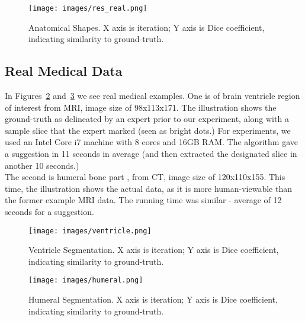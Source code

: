 \begin{figure}[htb]
\centering
  \texttt{[image: images/res\_real.png]}
  \caption[Anatomical Shapes]{
  Anatomical Shapes.
  X axis is iteration; Y axis is Dice coefficient, indicating similarity to ground-truth.}\label{fig:resAnatomical}
\end{figure}

\subsection{Real Medical Data}

In Figures~\ref{fig:ventricle} and~\ref{fig:humeral} we see real medical examples.
One is of brain ventricle region of interest from MRI, image size of 98x113x171.
The illustration shows the ground-truth as delineated by an expert prior to our experiment, along with a sample slice that the expert marked (seen as bright dots.)
For experiments, we used an Intel Core i7 machine with 8 cores and 16GB RAM.
The algorithm gave a suggestion in 11 seconds in average (and then extracted the designated slice in another 10 seconds.)
\\
The second is humeral bone part \cite{humeral98}, from CT, image size of 120x110x155.
This time, the illustration shows the actual data, as it is more human-viewable than the former example MRI data.
The running time was similar - average of 12 seconds for a suggestion.

\begin{figure}[htb]
\centering
  \texttt{[image: images/ventricle.png]}
  \caption[Ventricle Segmentation]{
  Ventricle Segmentation.
  X axis is iteration; Y axis is Dice coefficient, indicating similarity to ground-truth.}\label{fig:ventricle}
\end{figure}

\begin{figure}[htb]
\centering
  \texttt{[image: images/humeral.png]}
  \caption[Humeral Segmentation]{
  Humeral Segmentation.
  X axis is iteration; Y axis is Dice coefficient, indicating similarity to ground-truth.}\label{fig:humeral}
\end{figure}
